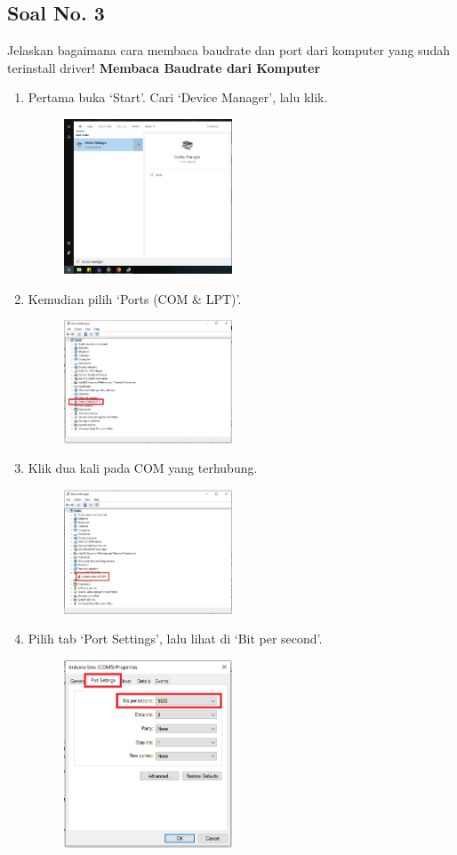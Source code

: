 \subsection{Soal No. 3}
Jelaskan bagaimana cara membaca baudrate dan port dari komputer yang sudah terinstall driver!
\textbf{Membaca Baudrate dari Komputer}
\begin{enumerate}
	\item Pertama buka `Start'. Cari `Device Manager', lalu klik.
	\begin{figure}[H]
		\includegraphics[width=5cm]{figures/5/1144124/Teori/d1.png}
		\centering
	\end{figure}
	\item Kemudian pilih `Ports (COM \& LPT)'.
	\begin{figure}[H]
		\includegraphics[width=5cm]{figures/5/1144124/Teori/d3.png}
		\centering
	\end{figure}
	\item Klik dua kali pada COM yang terhubung.
	\begin{figure}[H]
		\includegraphics[width=5cm]{figures/5/1144124/Teori/d2.png}
		\centering
	\end{figure}
	\item Pilih tab `Port Settings', lalu lihat di `Bit per second'.
	\begin{figure}[H]
		\includegraphics[width=5cm]{figures/5/1144124/Teori/d4.png}
		\centering
	\end{figure}
\end{enumerate}
